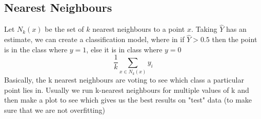 \documentclass[12pt]{article}
\begin{document}
\subsection{Nearest Neighbours}
Let $N_{k}(x)$ be the set of $k$ nearest neighbours to a point $x$. Taking $\hat{Y}$ has an estimate, we can create a classification model, where in if $\hat{Y} > 0.5$ then the point is in the class where $y=1$, else it is in class where $y=0$
\begin{equation}
    \frac{1}{k}\sum_{x \in N_{k}(x)} y_i
\end{equation}
Basically, the k nearest neighbours are voting to see which class a particular point lies in. Usually we run k-nearest neighbours for multiple values of k and then make a plot to see which gives us the best results on "test" data (to make sure that we are not overfitting) 
\end{document}
